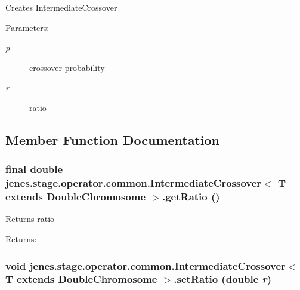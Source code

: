 Creates IntermediateCrossover

\begin{Desc}
\item[Parameters:]
\begin{description}
\item[{\em p}]crossover probability \item[{\em r}]ratio \end{description}
\end{Desc}


\subsection{Member Function Documentation}
\hypertarget{classjenes_1_1stage_1_1operator_1_1common_1_1_intermediate_crossover_3_01_t_01extends_01_double_chromosome_01_4_5b3f99723d401833db13476b27072985}{
\subsubsection[getRatio]{\setlength{\rightskip}{0pt plus 5cm}final double jenes.stage.operator.common.IntermediateCrossover$<$ T extends {\bf DoubleChromosome} $>$.getRatio ()}}
\label{classjenes_1_1stage_1_1operator_1_1common_1_1_intermediate_crossover_3_01_t_01extends_01_double_chromosome_01_4_5b3f99723d401833db13476b27072985}


Returns ratio \begin{Desc}
\item[Returns:]\end{Desc}
\hypertarget{classjenes_1_1stage_1_1operator_1_1common_1_1_intermediate_crossover_3_01_t_01extends_01_double_chromosome_01_4_1ed8c3472bcf1d00bebcb5f5e4f4988a}{
\subsubsection[setRatio]{\setlength{\rightskip}{0pt plus 5cm}void jenes.stage.operator.common.IntermediateCrossover$<$ T extends {\bf DoubleChromosome} $>$.setRatio (double {\em r})}}
\label{classjenes_1_1stage_1_1operator_1_1common_1_1_intermediate_crossover_3_01_t_01extends_01_double_chromosome_01_4_1ed8c3472bcf1d00bebcb5f5e4f4988a}



